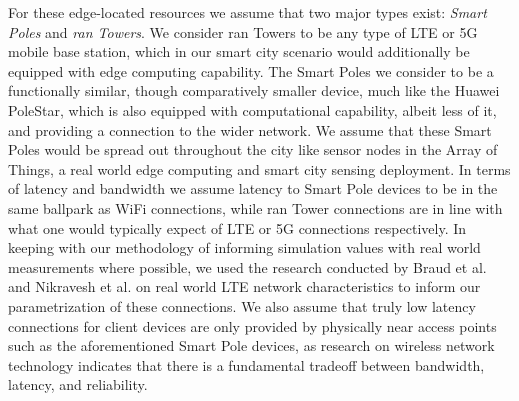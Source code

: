 For these edge-located resources we assume that two major types exist: \textit{Smart Poles} and \textit{\gls{ran} Towers}.
We consider \gls{ran} Towers to be any type of LTE or 5G mobile base station, which in our smart city scenario would additionally be equipped with edge computing capability.
The Smart Poles we consider to be a functionally similar, though comparatively smaller device, much like the Huawei PoleStar\cite{huaweiPolestar}, which is also equipped with computational capability, albeit less of it, and providing a connection to the wider network.
We assume that these Smart Poles would be spread out throughout the city like sensor nodes in the Array of Things\cite{catlettArrayThingsScientific2017a}, a real world edge computing and smart city sensing deployment.
In terms of latency and bandwidth we assume latency to Smart Pole devices to be in the same ballpark as WiFi connections, while \gls{ran} Tower connections are in line with what one would typically expect of LTE or 5G connections respectively.
In keeping with our methodology of informing simulation values with real world measurements where possible, we used the research conducted by Braud et al.\cite{braudMulticarrierMeasurementStudy2019} and Nikravesh et al.\cite{nikraveshMobileNetworkPerformance2014a} on real world LTE network characteristics to inform our parametrization of these connections.
We also assume that truly low latency connections for client devices are only provided by physically near access points such as the aforementioned Smart Pole devices, as research on wireless network technology indicates that there is a fundamental tradeoff between bandwidth, latency, and reliability\cite{soretFundamentalTradeoffsReliability2014}.

